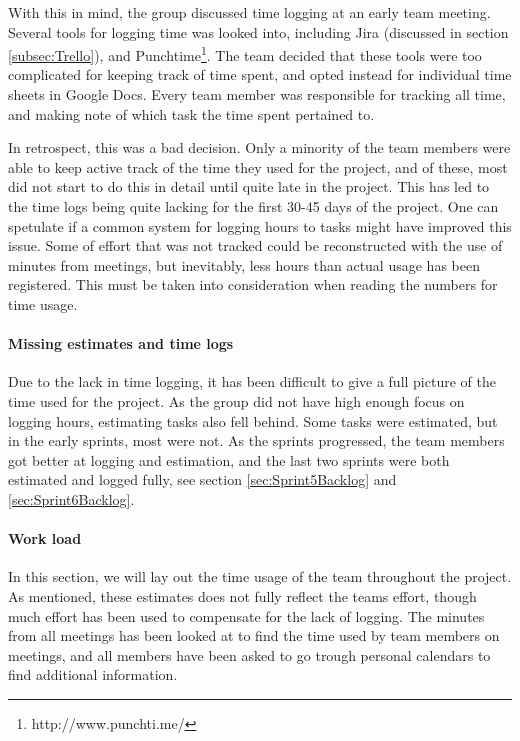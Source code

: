 \documentclass[11pt,a4paper,titlepage,oneside]{report}
\begin{document}
With this in mind, the group discussed time logging at an early team meeting. Several tools for logging time was looked into, including Jira (discussed in section \ref{subsec:Trello}), and Punchtime\footnote{http://www.punchti.me/}. The team decided that these tools were too complicated for keeping track of time spent, and opted instead for individual time sheets in Google Docs. Every team member was responsible for tracking all time, and making note of which task the time spent pertained to. 

In retrospect, this was a bad decision. Only a minority of the team members were able to keep active track of the time they used for the project, and of these, most did not start to do this in detail until quite late in the project. This has led to the time logs being quite lacking for the first 30-45 days of the project. One can spetulate if a common system for logging hours to tasks might have improved this issue. Some of effort that was not tracked could be reconstructed with the use of minutes from meetings, but inevitably, less hours than actual usage has been registered. This must be taken into consideration when reading the numbers for time usage.  

\paragraph{Missing estimates and time logs}
Due to the lack in time logging, it has been difficult to give a full picture of the time used for the project. As the group did not have high enough focus on logging hours, estimating tasks also fell behind. Some tasks were estimated, but in the early sprints, most were not. As the sprints progressed, the team members got better at logging and estimation, and the last two sprints were both estimated and logged fully, see section \ref{sec:Sprint5Backlog} and \ref{sec:Sprint6Backlog}.

\paragraph{Work load}
In this section, we will lay out the time usage of the team throughout the project. As mentioned, these estimates does not fully reflect the teams effort, though much effort has been used to compensate for the lack of logging. The minutes from all meetings has been looked at to find the time used by team members on meetings, and all members have been asked to go trough personal calendars to find additional information.
\end{document}
